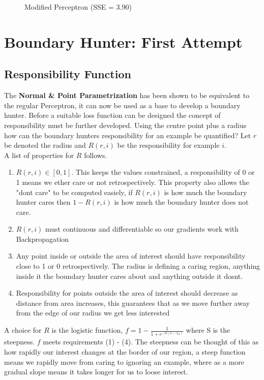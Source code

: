 \documentclass[notitlepage]{report}
\theoremstyle{definition}
\begin{document}
\begin{figure}[H]
\begin{minipage}[b]{0.4\textwidth}
    \caption{Modified Perceptron (SSE = 3.90)}
    \label{fig:com-normal-point}
  \end{minipage}
\end{figure}

\chapter{Boundary Hunter: First Attempt}
\section{Responsibility Function}
The \textbf{Normal \& Point Parametrization} has been shown to be equivalent to the regular Perceptron, it can now be used as a base to develop a boundary hunter. Before a suitable loss function can be designed the concept of responsibility must be further developed. Using the centre point plus a radius how can the boundary hunters responsibility for an example be quantified? Let $r$ be denoted the radius and $R(r, i)$ be the responsibility for example $i$.\\

A list of properties for $R$ follows.

\begin{enumerate}
	\item $R(r, i) \in [0, 1]$. This keeps the values constrained, a responsibility of 0 or 1 means we ether care or not retrospectively. This property also allows the "dont care" to be computed easiely, if $R(r, i)$ is how much the boundary hunter cares then $1 - R(r,i)$ is how much the boundary hunter does not care.
	\item $R(r, i)$ must continuous and differentiable so our gradients work with Backpropagation
	\item Any point inside or outside the area of interest should have responsibility close to 1 or 0 retrospectively. The radius is defining a caring region, anything inside it the boundary hunter cares about and anything outside it dosnt.
	\item Responsibility for points outside the area of interest should decrease as distance from area increases, this guarantees that as we move further away from the edge of our radius we get less interested
\end{enumerate}

A choice for $R$ is the logistic function, $f = 1 - \frac{1}{1 + e^{-S(x - x_0)}}$ where S is the steepness. $f$ meets requirements (1) - (4). The steepness can be thought of this as how rapidly our interest changes at the border of our region, a steep function means we rapidly move from caring to ignoring an example, where as a more gradual slope means it takes longer for us to loose interest.\\
\end{document}
